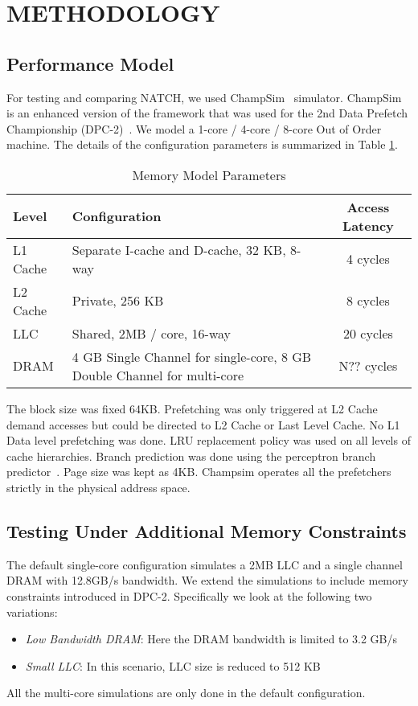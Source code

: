 \section{METHODOLOGY}
\label{Method}

\subsection{Performance Model}
\label{Method-Model}
For testing and comparing NATCH, we used ChampSim~\cite{Champsim}
simulator.  ChampSim is an enhanced version of the framework that was
used for the 2nd Data Prefetch Championship (DPC-2)~\cite{DPC_2}. We
model a 1-core / 4-core / 8-core Out of Order machine. The
details of the configuration parameters is summarized in Table
\ref{tab:Sim_params}.

\begin{table}[]
    \centering
    \begin{tabular}{|l|p{3.6cm}|c|}
    \hline
    Level & Configuration & Access Latency \\
    \hline
         L1 Cache & Separate I-cache and D-cache, 32 KB, 8-way & 4 cycles\\
         L2 Cache & Private, 256 KB & 8 cycles\\
         LLC & Shared, 2MB / core, 16-way & 20 cycles\\
         DRAM & 4 GB Single Channel for single-core, 8 GB Double Channel for multi-core & N?? cycles\\
    \hline
    \end{tabular}
    \caption{Memory Model Parameters}
    \label{tab:Sim_params}
\end{table}

The block size was fixed 64KB. Prefetching was only triggered at L2
Cache demand accesses but could be directed to L2 Cache or Last Level
Cache. No L1 Data level prefetching was done. LRU replacement policy
was used on all levels of cache hierarchies. Branch prediction was
done using the perceptron branch predictor~\cite{Perc_Branch}.  Page
size was kept as 4KB.  Champsim operates all the prefetchers strictly
in the physical address space.

\subsection{Testing Under Additional Memory Constraints}
\label{Method-AdditionalMem}
The default single-core configuration simulates a 2MB LLC and a single
channel DRAM with 12.8GB/s bandwidth.  We extend the simulations to
include memory constraints introduced in DPC-2.  Specifically we look
at the following two variations:
\begin{itemize}
\item \textit{Low Bandwidth DRAM}: Here the DRAM bandwidth is limited
  to 3.2 GB/s
\item \textit{Small LLC}: In this scenario, LLC size is reduced to 512
  KB
\end{itemize}
All the multi-core simulations are only done in the default
configuration.

